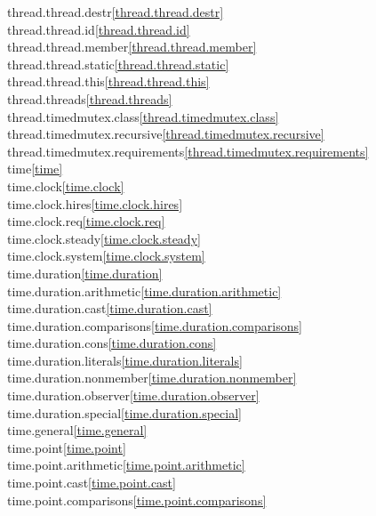 \begin{multicols}{2}
thread.thread.destr\quad\ref{thread.thread.destr}\\
thread.thread.id\quad\ref{thread.thread.id}\\
thread.thread.member\quad\ref{thread.thread.member}\\
thread.thread.static\quad\ref{thread.thread.static}\\
thread.thread.this\quad\ref{thread.thread.this}\\
thread.threads\quad\ref{thread.threads}\\
thread.timedmutex.class\quad\ref{thread.timedmutex.class}\\
thread.timedmutex.recursive\quad\ref{thread.timedmutex.recursive}\\
thread.timedmutex.requirements\quad\ref{thread.timedmutex.requirements}\\
time\quad\ref{time}\\
time.clock\quad\ref{time.clock}\\
time.clock.hires\quad\ref{time.clock.hires}\\
time.clock.req\quad\ref{time.clock.req}\\
time.clock.steady\quad\ref{time.clock.steady}\\
time.clock.system\quad\ref{time.clock.system}\\
time.duration\quad\ref{time.duration}\\
time.duration.arithmetic\quad\ref{time.duration.arithmetic}\\
time.duration.cast\quad\ref{time.duration.cast}\\
time.duration.comparisons\quad\ref{time.duration.comparisons}\\
time.duration.cons\quad\ref{time.duration.cons}\\
time.duration.literals\quad\ref{time.duration.literals}\\
time.duration.nonmember\quad\ref{time.duration.nonmember}\\
time.duration.observer\quad\ref{time.duration.observer}\\
time.duration.special\quad\ref{time.duration.special}\\
time.general\quad\ref{time.general}\\
time.point\quad\ref{time.point}\\
time.point.arithmetic\quad\ref{time.point.arithmetic}\\
time.point.cast\quad\ref{time.point.cast}\\
time.point.comparisons\quad\ref{time.point.comparisons}\\

\end{multicols}
